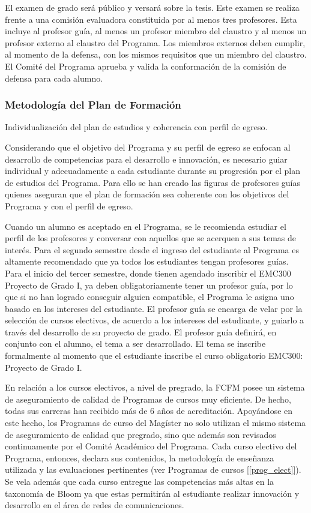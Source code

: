 
El examen de grado será público y versará sobre la tesis. Este examen se realiza frente a una
comisión evaluadora constituida por al menos tres profesores. Esta incluye al profesor guía, al
menos un profesor miembro del claustro y al menos un profesor externo al claustro del Programa.
Los miembros externos deben cumplir, al momento de la defensa, con los mismos requisitos que
un miembro del claustro. El Comité del Programa aprueba y valida la conformación de la comisión
de defensa para cada alumno.

\subsubsection{Metodología del Plan de Formación}

Individualización del plan de estudios y coherencia con perfil de egreso. 

Considerando que el objetivo del Programa y su perfil de egreso se enfocan al desarrollo de competencias para
el desarrollo e innovación, es necesario guiar individual y adecuadamente a cada estudiante durante su
progresión por el plan de estudios del Programa. Para ello se han creado las figuras de profesores
guías quienes aseguran que el plan de formación sea coherente con los objetivos del Programa
y con el perfil de egreso.

Cuando un alumno es aceptado en el Programa, se le recomienda estudiar el perfil de los profesores 
y conversar con aquellos que se acerquen a sus temas de interés. Para el segundo semestre desde el 
ingreso del estudiante al Programa es altamente recomendado que ya todos los estudiantes tengan 
profesores guías. Para el inicio del tercer semestre, donde tienen agendado inscribir el EMC300 Proyecto de Grado I, 
ya deben obligatoriamente tener un profesor guía, por lo que si no han logrado conseguir alguien compatible,
el Programa le asigna uno basado en los intereses del estudiante. El profesor guía se encarga de 
velar por la selección de cursos electivos, de acuerdo a los intereses del estudiante, y guiarlo 
a través del desarrollo de su proyecto de grado. El profesor guía definirá, en conjunto con el alumno, el tema a
ser desarrollado. El tema se inscribe formalmente al momento
que el estudiante inscribe el curso obligatorio EMC300: Proyecto de Grado I.

En relación a los cursos electivos, a nivel de pregrado, la FCFM posee un sistema de aseguramiento de calidad
de Programas de cursos muy eficiente. De hecho, todas sus carreras han recibido más de 6
años de acreditación. Apoyándose en este hecho, los Programas de curso del Magíster no
solo utilizan el mismo sistema de aseguramiento de calidad que pregrado, sino que además
son revisados continuamente por el Comité Académico del Programa. Cada curso electivo
del Programa, entonces, declara sus contenidos, la metodología de enseñanza utilizada y las
evaluaciones pertinentes (ver Programas de cursos [\ref{prog_elect}]). Se vela además que cada curso entregue
las competencias más altas en la taxonomía de Bloom ya que estas permitirán al estudiante realizar
innovación y desarrollo en el área de redes de comunicaciones.

